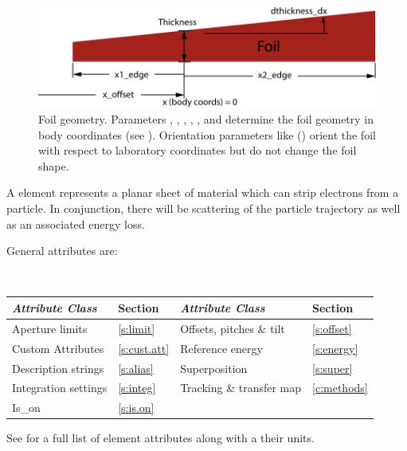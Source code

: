 \begin{figure}[tb]
  \centering
  \includegraphics[width=5in]{foil.pdf}
  \caption[Foil geometry.]
{Foil geometry. Parameters , , , ,
, and  determine the foil geometry in body coordinates (see ).
Orientation parameters like  () orient the foil with respect to
laboratory coordinates but do not change the foil shape.}
  \label{f:foil}
\end{figure}

A  element represents a planar sheet of material which can strip electrons from a particle.
In conjunction, there will be scattering of the particle trajectory as well as an associated energy
loss.

General  attributes are:
\begin{center}
\tt
\begin{tabular}{llll} \toprule
  {\sl Attribute Class}      & Section           & {\sl Attribute Class}      & Section            \\ \midrule
  Aperture limits            & \ref{s:limit}     & Offsets, pitches \& tilt   & \ref{s:offset}     \\
  Custom Attributes          & \ref{s:cust.att}  & Reference energy           & \ref{s:energy}     \\ 
  Description strings        & \ref{s:alias}     & Superposition              & \ref{s:super}      \\
  Integration settings       & \ref{s:integ}     & Tracking \& transfer map   & \ref{c:methods}    \\ 
  Is_on                      & \ref{s:is.on}     &                            &                    \\
  \bottomrule
\end{tabular}
\end{center}
\toffset
See  for a full list of element attributes along with a their units.

